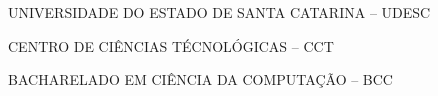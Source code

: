 
\renewcommand{\imprimircapa}{%
	\begin{capa}%
		\center

		{\fontseries{b}\selectfont\MakeTextUppercase{UNIVERSIDADE DO ESTADO DE SANTA CATARINA -- UDESC}}

		{\fontseries{b}\selectfont\MakeTextUppercase{CENTRO DE CIÊNCIAS TÉCNOLÓGICAS -- CCT  }}

		{\fontseries{b}\selectfont\MakeTextUppercase{BACHARELADO EM CIÊNCIA DA COMPUTAÇÃO -- BCC  }}

		\vfill

		{\fontseries{b}\selectfont\MakeTextUppercase{\normalsize\imprimirautor}}

		\vfill
		\begin{center}
			{\fontseries{b}\selectfont\MakeTextUppercase{\imprimirtitulo}}
		\end{center}
		\vfill

		\vfill

		{\fontseries{b}\selectfont\MakeTextUppercase{\imprimirlocal}}
		\par
		{\selectfont \imprimirdata}
		\vspace*{1cm}
	\end{capa}
}

\imprimircapa